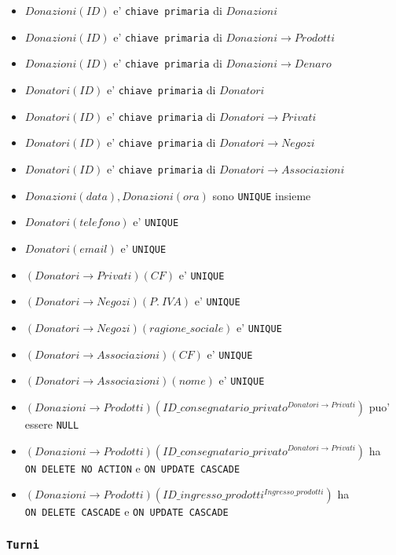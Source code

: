\documentclass[]{article}
\providecommand{\tightlist}{%
  \setlength{\itemsep}{0pt}\setlength{\parskip}{0pt}}
\begin{document}
\begin{itemize}
\tightlist
\item
  \(Donazioni(ID)\) e' \texttt{chiave\ primaria} di \(Donazioni\)
\item
  \(Donazioni(ID)\) e' \texttt{chiave\ primaria} di
  \(Donazioni \to Prodotti\)
\item
  \(Donazioni(ID)\) e' \texttt{chiave\ primaria} di
  \(Donazioni \to Denaro\)
\item
  \(Donatori(ID)\) e' \texttt{chiave\ primaria} di \(Donatori\)
\item
  \(Donatori(ID)\) e' \texttt{chiave\ primaria} di
  \(Donatori \to Privati\)
\item
  \(Donatori(ID)\) e' \texttt{chiave\ primaria} di
  \(Donatori \to Negozi\)
\item
  \(Donatori(ID)\) e' \texttt{chiave\ primaria} di
  \(Donatori \to Associazioni\)
\item
  \(Donazioni(data), Donazioni(ora)\) sono \texttt{UNIQUE} insieme
\item
  \(Donatori(telefono)\) e' \texttt{UNIQUE}
\item
  \(Donatori(email)\) e' \texttt{UNIQUE}
\item
  \((Donatori \to Privati)(CF)\) e' \texttt{UNIQUE}
\item
  \((Donatori \to Negozi)(P.\ IVA)\) e' \texttt{UNIQUE}
\item
  \((Donatori \to Negozi)(ragione\_sociale)\) e' \texttt{UNIQUE}
\item
  \((Donatori \to Associazioni)(CF)\) e' \texttt{UNIQUE}
\item
  \((Donatori \to Associazioni)(nome)\) e' \texttt{UNIQUE}
\item
  \((Donazioni \to Prodotti)(ID\_consegnatario\_privato^{Donatori \to Privati})\)
  puo' essere \texttt{NULL}
\item
  \((Donazioni \to Prodotti)(ID\_consegnatario\_privato^{Donatori \to Privati})\)
  ha \texttt{ON\ DELETE\ NO\ ACTION} e \texttt{ON\ UPDATE\ CASCADE}
\item
  \((Donazioni \to Prodotti)(ID\_ingresso\_prodotti^{Ingresso\_prodotti})\)
  ha \texttt{ON\ DELETE\ CASCADE} e \texttt{ON\ UPDATE\ CASCADE}
\end{itemize}

\hypertarget{turni}{%
\subsubsection{\texorpdfstring{\texttt{Turni}}{Turni}}\label{turni}}
\end{document}
